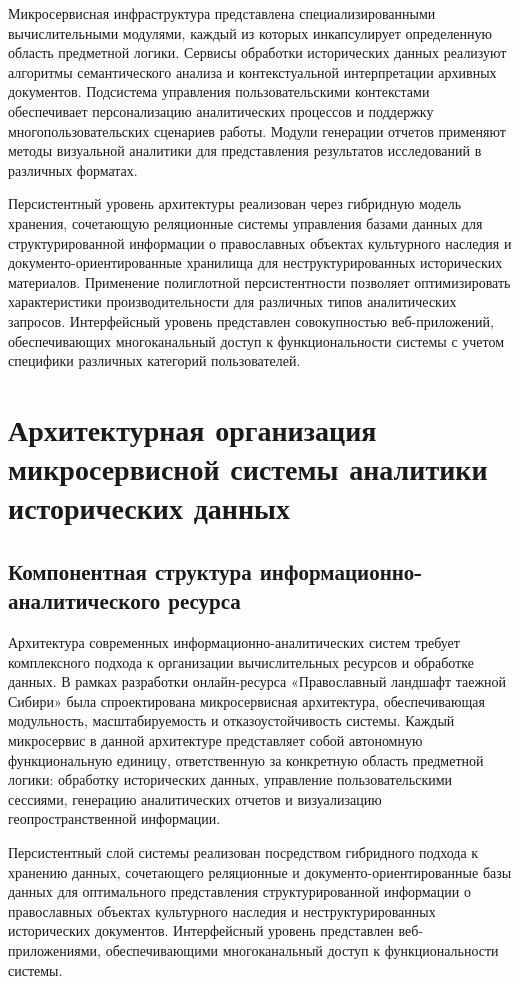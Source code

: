 Микросервисная инфраструктура представлена специализированными вычислительными модулями, каждый из которых инкапсулирует определенную область предметной логики. Сервисы обработки исторических данных реализуют алгоритмы семантического анализа и контекстуальной интерпретации архивных документов. Подсистема управления пользовательскими контекстами обеспечивает персонализацию аналитических процессов и поддержку многопользовательских сценариев работы. Модули генерации отчетов применяют методы визуальной аналитики для представления результатов исследований в различных форматах.

Персистентный уровень архитектуры реализован через гибридную модель хранения, сочетающую реляционные системы управления базами данных для структурированной информации о православных объектах культурного наследия и документо-ориентированные хранилища для неструктурированных исторических материалов. Применение полиглотной персистентности позволяет оптимизировать характеристики производительности для различных типов аналитических запросов. Интерфейсный уровень представлен совокупностью веб-приложений, обеспечивающих многоканальный доступ к функциональности системы с учетом специфики различных категорий пользователей.


\section{Архитектурная организация микросервисной системы аналитики исторических данных}

\subsection{Компонентная структура информационно-аналитического ресурса}

Архитектура современных информационно-аналитических систем требует комплексного подхода к организации вычислительных ресурсов и обработке данных. В рамках разработки онлайн-ресурса «Православный ландшафт таежной Сибири» была спроектирована микросервисная архитектура, обеспечивающая модульность, масштабируемость и отказоустойчивость системы. Каждый микросервис в данной архитектуре представляет собой автономную функциональную единицу, ответственную за конкретную область предметной логики: обработку исторических данных, управление пользовательскими сессиями, генерацию аналитических отчетов и визуализацию геопространственной информации.

Персистентный слой системы реализован посредством гибридного подхода к хранению данных, сочетающего реляционные и документо-ориентированные базы данных для оптимального представления структурированной информации о православных объектах культурного наследия и неструктурированных исторических документов. Интерфейсный уровень представлен веб-приложениями, обеспечивающими многоканальный доступ к функциональности системы.

